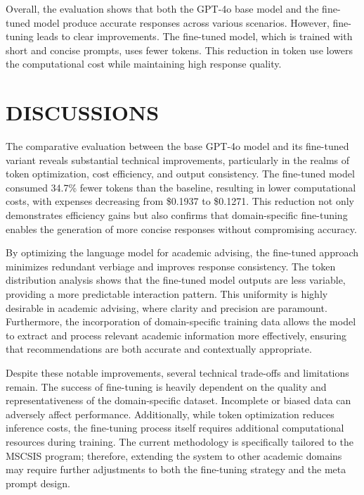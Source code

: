 \documentclass[12pt,oneside,openany]{report}
\begin{document}
Overall, the evaluation shows that both the GPT-4o base model and the fine-tuned model produce accurate responses across various scenarios. However, fine-tuning leads to clear improvements. The fine-tuned model, which is trained with short and concise prompts, uses fewer tokens. This reduction in token use lowers the computational cost while maintaining high response quality.



\chapter{DISCUSSIONS}

The comparative evaluation between the base GPT-4o model and its fine-tuned variant reveals substantial technical improvements, particularly in the realms of token optimization, cost efficiency, and output consistency. The fine-tuned model consumed 34.7\% fewer tokens than the baseline, resulting in lower computational costs, with expenses decreasing from \$0.1937 to \$0.1271. This reduction not only demonstrates efficiency gains but also confirms that domain-specific fine-tuning enables the generation of more concise responses without compromising accuracy.

By optimizing the language model for academic advising, the fine-tuned approach minimizes redundant verbiage and improves response consistency. The token distribution analysis shows that the fine-tuned model outputs are less variable, providing a more predictable interaction pattern. This uniformity is highly desirable in academic advising, where clarity and precision are paramount. Furthermore, the incorporation of domain-specific training data allows the model to extract and process relevant academic information more effectively, ensuring that recommendations are both accurate and contextually appropriate.

Despite these notable improvements, several technical trade-offs and limitations remain. The success of fine-tuning is heavily dependent on the quality and representativeness of the domain-specific dataset. Incomplete or biased data can adversely affect performance. Additionally, while token optimization reduces inference costs, the fine-tuning process itself requires additional computational resources during training. The current methodology is specifically tailored to the MSCSIS program; therefore, extending the system to other academic domains may require further adjustments to both the fine-tuning strategy and the meta prompt design.
\end{document}
